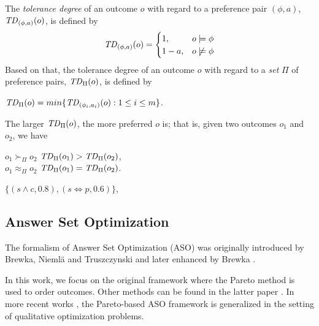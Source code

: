 The \textit{tolerance degree} of an outcome $o$ with regard to a preference 
pair $(\phi,a)$, $\mathit{TD}_{(\phi,a)}(o)$, is defined by
\[
 \mathit{TD}_{(\phi,a)}(o) =
  \begin{cases}
   1, & o \models \phi \\
   1-a, & o \not \models \phi
  \end{cases}
\]
Based on that, the tolerance degree of an outcome $o$ with regard to a \emph{set}
$\Pi$ of preference pairs, $\mathit{TD}_\Pi(o)$, is defined by 
\begin{center}
	$\mathit{TD}_\Pi(o)=min\{\mathit{TD}_{(\phi_i,a_i)}(o):1\leq i \leq m\}$.
\end{center}
The larger $\mathit{TD}_\Pi(o)$, the more preferred $o$ is; that is, 
given two outcomes $o_1$ and $o_2$, we have
\begin{center}
	$o_1 \succ_\Pi o_2$ \itiff $\mathit{TD}_\Pi(o_1) > \mathit{TD}_\Pi(o_2)$,\\
	$o_1 \approx_\Pi o_2$ \itiff $\mathit{TD}_\Pi(o_1) = \mathit{TD}_\Pi(o_2)$.
\end{center}

\begin{center}
	$\{ (s\land c,0.8), (s \Leftrightarrow p,0.6) \}$,
\end{center}



\subsection{Answer Set Optimization}
The formalism of Answer Set Optimization (ASO) was originally introduced by
Brewka, Nieml\"a and Truszczynski \cite{Brewka03answerset} and
later enhanced by Brewka \cite{Brewka04}.

In this work, we focus on the original framework \cite{Brewka03answerset} where 
the Pareto method is used to order outcomes.
Other methods can be found in the latter paper \cite{Brewka04}.
In more recent works \cite{Faber:QOP,Faber:APF}, 
the Pareto-based ASO framework is generalized in the setting of
qualitative optimization problems.

